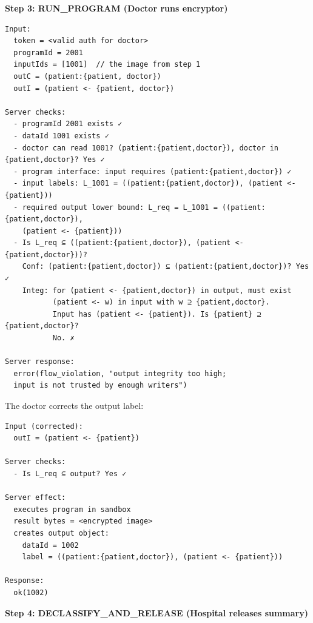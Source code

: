 \textbf{Step 3: RUN\_PROGRAM (Doctor runs encryptor)}

\begin{verbatim}
Input:
  token = <valid auth for doctor>
  programId = 2001
  inputIds = [1001]  // the image from step 1
  outC = (patient:{patient, doctor})
  outI = (patient <- {patient, doctor})

Server checks:
  - programId 2001 exists ✓
  - dataId 1001 exists ✓
  - doctor can read 1001? (patient:{patient,doctor}), doctor in {patient,doctor}? Yes ✓
  - program interface: input requires (patient:{patient,doctor}) ✓
  - input labels: L_1001 = ((patient:{patient,doctor}), (patient <- {patient}))
  - required output lower bound: L_req = L_1001 = ((patient:{patient,doctor}), 
    (patient <- {patient}))
  - Is L_req ⊆ ((patient:{patient,doctor}), (patient <- {patient,doctor}))?
    Conf: (patient:{patient,doctor}) ⊆ (patient:{patient,doctor})? Yes ✓
    Integ: for (patient <- {patient,doctor}) in output, must exist 
           (patient <- w) in input with w ⊇ {patient,doctor}.
           Input has (patient <- {patient}). Is {patient} ⊇ {patient,doctor}? 
           No. ✗
    
Server response:
  error(flow_violation, "output integrity too high; 
  input is not trusted by enough writers")
\end{verbatim}

The doctor corrects the output label:

\begin{verbatim}
Input (corrected):
  outI = (patient <- {patient})

Server checks:
  - Is L_req ⊆ output? Yes ✓
  
Server effect:
  executes program in sandbox
  result bytes = <encrypted image>
  creates output object:
    dataId = 1002
    label = ((patient:{patient,doctor}), (patient <- {patient}))
    
Response:
  ok(1002)
\end{verbatim}

\textbf{Step 4: DECLASSIFY\_AND\_RELEASE (Hospital releases summary)}

